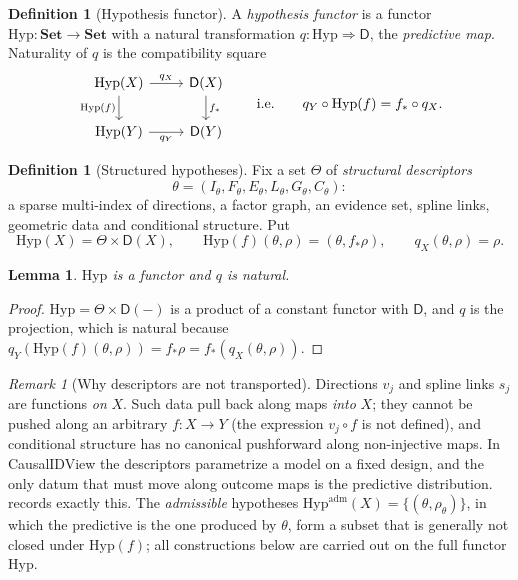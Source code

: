 \documentclass[11pt]{article}
\newtheorem{lemma}[theorem]{Lemma}
\theoremstyle{definition}
\newtheorem{definition}[theorem]{Definition}
\theoremstyle{remark}
\newtheorem{remark}[theorem]{Remark}
\newcommand{\D}{\mathsf{D}}
\newcommand{\Set}{\mathbf{Set}}
\newcommand{\Hyp}{\mathrm{Hyp}}
\begin{document}
\begin{definition}[Hypothesis functor]\label{def:hypfunctor}
A \emph{hypothesis functor} is a functor $\Hyp\colon\Set\to\Set$ with a natural transformation
$q\colon\Hyp\Rightarrow\D$, the \emph{predictive map}. Naturality of $q$ is the compatibility square
\[
\begin{tikzcd}
\Hyp(X) \arrow[r,"q_X"] \arrow[d,"\Hyp(f)"'] & \D(X) \arrow[d,"f_*"]\\
\Hyp(Y) \arrow[r,"q_Y"'] & \D(Y)
\end{tikzcd}
\qquad\text{i.e.}\qquad q_Y\circ\Hyp(f)=f_*\circ q_X .
\]
\end{definition}

\begin{definition}[Structured hypotheses]\label{def:structured}
Fix a set $\Theta$ of \emph{structural descriptors}
\[\theta=(I_\theta,F_\theta,E_\theta,L_\theta,G_\theta,C_\theta):\]
a sparse multi-index of
directions, a factor graph, an evidence set, spline links, geometric data and conditional structure.
Put
\[
\Hyp(X)=\Theta\times\D(X),\qquad \Hyp(f)(\theta,\rho)=(\theta,f_*\rho),\qquad q_X(\theta,\rho)=\rho .
\]
\end{definition}

\begin{lemma}\label{lem:hyp-functor}
$\Hyp$ is a functor and $q$ is natural.
\end{lemma}
\begin{proof}
$\Hyp=\Theta\times\D(-)$ is a product of a constant functor with $\D$, and $q$ is the projection,
which is natural because $q_Y(\Hyp(f)(\theta,\rho))=f_*\rho=f_*(q_X(\theta,\rho))$.
\end{proof}

\begin{remark}[Why descriptors are not transported]\label{rem:variance}
Directions $v_j$ and spline links $s_j$ are functions \emph{on} $X$. Such data pull back along maps
\emph{into} $X$; they cannot be pushed along an arbitrary $f\colon X\to Y$ (the expression $v_j\circ f$
is not defined), and conditional structure has no canonical pushforward along non-injective maps. In
CausalIDView the descriptors parametrize a model on a fixed design, and the only datum that must move
along outcome maps is the predictive distribution.  records exactly this. The
\emph{admissible} hypotheses $\Hyp^{\mathrm{adm}}(X)=\{(\theta,\rho_\theta)\}$, in which the
predictive is the one produced by $\theta$, form a subset that is generally not closed under
$\Hyp(f)$; all constructions below are carried out on the full functor $\Hyp$.
\end{remark}
\end{document}
